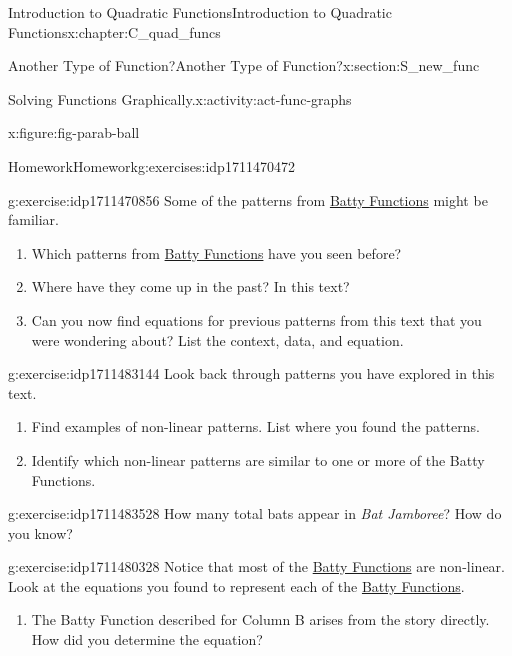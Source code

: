 \documentclass[oneside,10pt,]{book}
\newcommand{\pubtitle}[1]{\textsl{#1}}
\numberwithin{equation}{chapter}
\begin{document}
\begin{chapterptx}{Introduction to Quadratic Functions}{}{Introduction to Quadratic Functions}{}{}{x:chapter:C_quad_funcs}
\begin{sectionptx}{Another Type of Function?}{}{Another Type of Function?}{}{}{x:section:S_new_func}
\begin{activity}{Solving Functions Graphically.}{x:activity:act-func-graphs}
\begin{figureptx}{}{x:figure:fig-parab-ball}{}
\begin{image}{0.25}{0.5}{0.25}
\end{image}%
\tcblower
\end{figureptx}%
\end{activity}%
%
%
\typeout{************************************************}
\typeout{************************************************}
%
\begin{exercises-subsection}{Homework}{}{Homework}{}{}{g:exercises:idp1711470472}
\begin{divisionexercise}{1}{}{}{g:exercise:idp1711470856}%
Some of the patterns from \hyperref[x:worksheet:act-batty-func]{Batty Functions} might be familiar.%
\begin{enumerate}[font=\bfseries,label=(\alph*),ref=\alph*]
\item{}Which patterns from \hyperref[x:worksheet:act-batty-func]{Batty Functions} have you seen before?%
\item{}Where have they come up in the past? In this text?%
\item{}Can you now find equations for previous patterns from this text that you were wondering about? List the context, data, and equation.%
\end{enumerate}
\end{divisionexercise}%
\begin{divisionexercise}{2}{}{}{g:exercise:idp1711483144}%
Look back through patterns you have explored in this text.%
\begin{enumerate}[font=\bfseries,label=(\alph*),ref=\alph*]
\item{}Find examples of non-linear patterns. List where you found the patterns.%
\item{}Identify which non-linear patterns are similar to one or more of the Batty Functions.%
\end{enumerate}
\end{divisionexercise}%
\begin{divisionexercise}{3}{}{}{g:exercise:idp1711483528}%
How many total bats appear in \pubtitle{Bat Jamboree}? How do you know?%
\end{divisionexercise}%
\begin{divisionexercise}{4}{}{}{g:exercise:idp1711480328}%
Notice that most of the \hyperref[x:worksheet:act-batty-func]{Batty Functions} are non-linear. Look at the equations you found to represent each of the \hyperref[x:worksheet:act-batty-func]{Batty Functions}.%
\begin{enumerate}[font=\bfseries,label=(\alph*),ref=\alph*]
\item{}The Batty Function described for Column B arises from the story directly. How did you determine the equation?%

\end{enumerate}
\end{divisionexercise}
\end{exercises-subsection}
\end{sectionptx}
\end{chapterptx}
\end{document}

